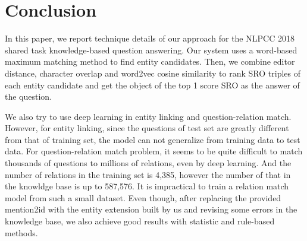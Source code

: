 \documentclass{llncs}
\begin{document}
\section{Conclusion}

In this paper, we report technique details of our approach for the NLPCC 2018 
shared task knowledge-based question answering. Our system uses a word-based 
maximum matching method to find entity candidates. Then, we combine editor 
distance, character overlap and word2vec cosine similarity to rank SRO triples 
of each entity candidate and get the object of the top 1 score SRO as the 
answer of the question. 

We also try to use deep learning in entity linking 
and question-relation match. However, for entity linking, since the questions 
of test set are greatly different from that of training set, the model can not 
generalize from training data to test data. For question-relation match 
problem, it seems to be quite difficult to match thousands of questions to 
millions of relations, even by deep learning. And the number of relations in 
the training set is 4,385, however the number of that in the knowldge base is 
up to 587,576. It is impractical to train a relation match model from such a 
small dataset. Even though, after replacing the provided mention2id with the 
entity extension built by us and revising some errors in the knowledge base, we 
also achieve good results with statistic and rule-based methods.
\end{document}

